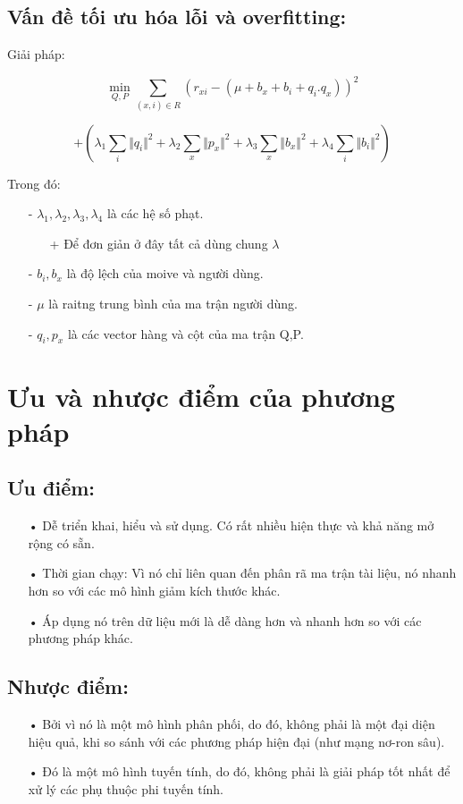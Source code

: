 \documentclass[a4paper,11pt]{report}
\begin{document}
\subsection{Vấn đề tối ưu hóa lỗi và overfitting:}
Giải pháp:
\begin{flushleft}
\begin{displaymath}
\displaystyle \min_{Q,P} \sum_{(x,i)\in R}(r_{xi} - (\mu + b_x + b_i + q_i.q_x))^2
\end{displaymath}
\end{flushleft}
\begin{center}
\begin{displaymath}
\displaystyle
+ (\lambda_1\sum_{i}\Vert q_i \Vert^{2} + \lambda_2\sum_x\Vert p_x \Vert^2 + \lambda_3\sum_x\Vert b_x \Vert^2 + \lambda_4\sum_i\Vert b_i \Vert^2)
\end{displaymath}
\end{center}
Trong đó:
\begin{itemize}
\item[-] $\lambda_1,\lambda_2,\lambda_3,\lambda_4$ là các hệ số phạt.
\begin{itemize}
\item[+] Để đơn giản ở đây tất cả dùng chung $\lambda$
\end{itemize}
\item[-] $b_i,b_x$ là độ lệch của moive và người dùng.
\item[-] $\mu$ là raitng trung bình của ma trận người dùng.
\item[-] $q_i,p_x$ là các vector hàng và cột của ma trận Q,P.
\end{itemize}
\section{Ưu và nhược điểm của phương pháp}
\subsection{Ưu điểm:}
\begin{itemize}
\item[•] Dễ triển khai, hiểu và sử dụng. Có rất nhiều hiện thực và khả năng mở rộng có sẵn.
\item[•] Thời gian chạy: Vì nó chỉ liên quan đến phân rã ma trận tài liệu, nó nhanh hơn so với các mô hình giảm kích thước khác.
\item[•] Áp dụng nó trên dữ liệu mới là dễ dàng hơn và nhanh hơn so với các phương pháp khác.
\end{itemize}
\subsection{Nhược điểm:}
\begin{itemize}
\item[•] Bởi vì nó là một mô hình phân phối, do đó, không phải là một đại diện hiệu quả, khi so sánh với các phương pháp hiện đại (như mạng nơ-ron sâu).
\item[•] Đó là một mô hình tuyến tính, do đó, không phải là giải pháp tốt nhất để xử lý các phụ thuộc phi tuyến tính.
\end{itemize}
\end{document}
